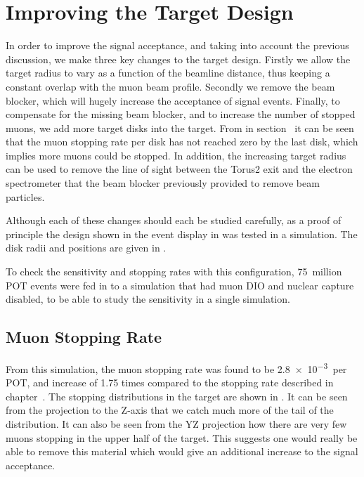 \section{Improving the Target Design}
In order to improve the signal acceptance, and taking into account the previous discussion, we make three key changes to the target design.
Firstly we allow the target radius to vary as a function of the beamline distance, thus keeping a constant overlap with the muon beam profile.
Secondly we remove the beam blocker, which will hugely increase the acceptance of signal events.
Finally, to compensate for the missing beam blocker, and to increase the number of stopped muons, we add more target disks into the target.
From  in section~ it can be seen that the muon stopping rate per disk has not reached zero by the last disk, which implies more muons could be stopped.
In addition, the increasing target radius can be used to remove the line of sight between the Torus2 exit and the electron spectrometer that the beam blocker previously provided to remove beam particles.

\FigTgtImprovNewGeom
\TabTgtImprovDiskParams
Although each of these changes should each be studied carefully, as a proof of principle the design shown in the event display in  was tested in a simulation.
The disk radii and positions are given in .

To check the sensitivity and stopping rates with this configuration, 75~million POT events were fed in to a simulation that had muon \acf{DIO} and nuclear capture disabled, to be able to study the sensitivity in a single simulation.

\subsection{Muon Stopping Rate}
\FigTgtImprovMuStops
\FigTgtImprovMuMomentum
\FigTgtImprovSignalDistribution
From this simulation, the muon stopping rate was found to be \num{2.8e-3}~per POT, and increase of 1.75 times compared to the stopping rate described in chapter~.
The stopping distributions in the target are shown in .
It can be seen from the projection to the Z-axis that we catch much more of the tail of the distribution.
It can also be seen from the YZ projection how there are very few muons stopping in the upper half of the target. 
This suggests one would really be able to remove this material which would give an additional increase to the signal acceptance.

